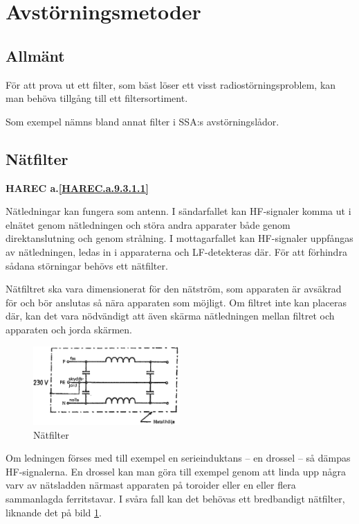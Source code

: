 \section{Avstörningsmetoder}

\subsection{Allmänt}
För att prova ut ett filter, som bäst löser ett visst radiostörningsproblem,
kan man behöva tillgång till ett filtersortiment.

Som exempel nämns bland annat filter i SSA:s avstörningslådor.

\subsection{Nätfilter}
\textbf{
HAREC a.\ref{HAREC.a.9.3.1.1}\label{myHAREC.a.9.3.1.1}
}

Nätledningar kan fungera som antenn.
I sändarfallet kan HF-signaler komma ut i elnätet genom nätledningen och störa
andra apparater både genom direktanslutning och genom strålning.
I mottagarfallet kan HF-signaler uppfångas av nätledningen, ledas in i
apparaterna och LF-detekteras där.
För att förhindra sådana störningar behövs ett nätfilter.

Nätfiltret ska vara dimensionerat för den nätström, som apparaten är avsäkrad
för och bör anslutas så nära apparaten som möjligt.
Om filtret inte kan placeras där, kan det vara nödvändigt att även skärma
nätledningen mellan filtret och apparaten och jorda skärmen.

\begin{figure}
  \includegraphics[width=0.5\textwidth]{images/cropped_pdfs/bild_2_9-01.pdf}
  \caption{Nätfilter}
  \label{fig:bildII9-1}
\end{figure}

Om ledningen förses med till exempel en serieinduktans -- en drossel -- så dämpas
HF-signalerna.
En drossel kan man göra till exempel genom att linda upp några varv av nätsladden
närmast apparaten på toroider eller en eller flera sammanlagda ferritstavar.
I svåra fall kan det behövas ett bredbandigt nätfilter, liknande
det på bild \ref{fig:bildII9-1}.

